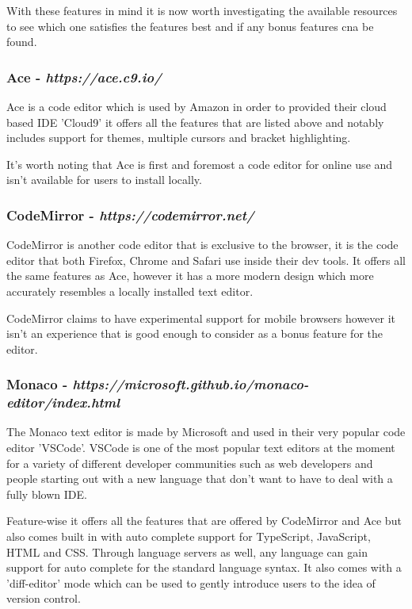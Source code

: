 With these features in mind it is now worth investigating the available resources to see which one satisfies the features best and if any bonus features cna be found.

\subsubsection{Ace - \textit{https://ace.c9.io/}}

Ace is a code editor which is used by Amazon in order to provided their cloud based IDE 'Cloud9' it offers all the features that are listed above and notably includes support for themes, multiple cursors and bracket highlighting.

It's worth noting that Ace is first and foremost a code editor for online use and isn't available for users to install locally.

\subsubsection{CodeMirror - \textit{https://codemirror.net/}}

CodeMirror is another code editor that is exclusive to the browser, it is the code editor that both Firefox, Chrome and Safari use inside their dev tools. It offers all the same features as Ace, however it has a more modern design which more accurately resembles a locally installed text editor.

CodeMirror claims to have experimental support for mobile browsers however it isn't an experience that is good enough to consider as a bonus feature for the editor.

\subsubsection{Monaco - \textit{https://microsoft.github.io/monaco-editor/index.html}}

The Monaco text editor is made by Microsoft and used in their very popular code editor 'VSCode'. VSCode is one of the most popular text editors at the moment for a variety of different developer communities such as web developers and people starting out with a new language that don't want to have to deal with a fully blown IDE.

Feature-wise it offers all the features that are offered by CodeMirror and Ace but also comes built in with auto complete support for TypeScript, JavaScript, HTML and CSS. Through language servers as well, any language can gain support for auto complete for the standard language syntax. It also comes with a 'diff-editor' mode which can be used to gently introduce users to the idea of version control.

